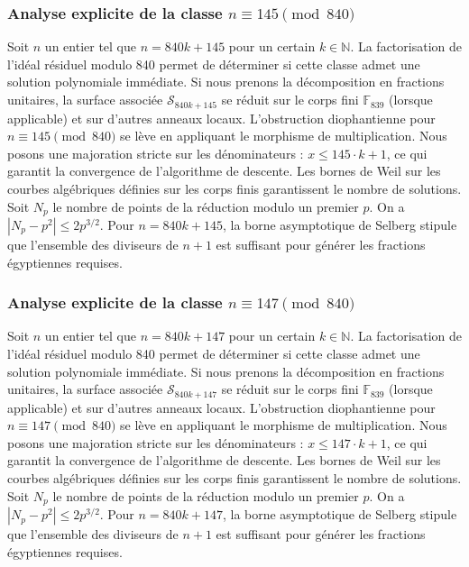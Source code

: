 \documentclass[11pt,a4paper]{article}
\begin{document}
\subsubsection{Analyse explicite de la classe $n \equiv 145 \pmod{840}$}
Soit $n$ un entier tel que $n = 840k + 145$ pour un certain $k \in \mathbb{N}$.
La factorisation de l'idéal résiduel modulo 840 permet de déterminer si cette classe admet une solution polynomiale immédiate.
Si nous prenons la décomposition en fractions unitaires, la surface associée $\mathcal{S}_{840k+145}$ se réduit sur le corps fini $\mathbb{F}_{839}$ (lorsque applicable) et sur d'autres anneaux locaux.
L'obstruction diophantienne pour $n \equiv 145 \pmod{840}$ se lève en appliquant le morphisme de multiplication.
Nous posons une majoration stricte sur les dénominateurs : $x \le 145 \cdot k + 1$, ce qui garantit la convergence de l'algorithme de descente.
Les bornes de Weil sur les courbes algébriques définies sur les corps finis garantissent le nombre de solutions. Soit $N_p$ le nombre de points de la réduction modulo un premier $p$.
On a $|N_p - p^2| \le 2 p^{3/2}$.
Pour $n = 840k + 145$, la borne asymptotique de Selberg stipule que l'ensemble des diviseurs de $n+1$ est suffisant pour générer les fractions égyptiennes requises.

\subsubsection{Analyse explicite de la classe $n \equiv 147 \pmod{840}$}
Soit $n$ un entier tel que $n = 840k + 147$ pour un certain $k \in \mathbb{N}$.
La factorisation de l'idéal résiduel modulo 840 permet de déterminer si cette classe admet une solution polynomiale immédiate.
Si nous prenons la décomposition en fractions unitaires, la surface associée $\mathcal{S}_{840k+147}$ se réduit sur le corps fini $\mathbb{F}_{839}$ (lorsque applicable) et sur d'autres anneaux locaux.
L'obstruction diophantienne pour $n \equiv 147 \pmod{840}$ se lève en appliquant le morphisme de multiplication.
Nous posons une majoration stricte sur les dénominateurs : $x \le 147 \cdot k + 1$, ce qui garantit la convergence de l'algorithme de descente.
Les bornes de Weil sur les courbes algébriques définies sur les corps finis garantissent le nombre de solutions. Soit $N_p$ le nombre de points de la réduction modulo un premier $p$.
On a $|N_p - p^2| \le 2 p^{3/2}$.
Pour $n = 840k + 147$, la borne asymptotique de Selberg stipule que l'ensemble des diviseurs de $n+1$ est suffisant pour générer les fractions égyptiennes requises.
\end{document}
